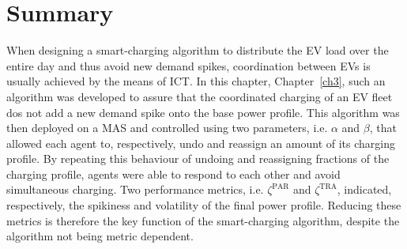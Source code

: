 \section{Summary}
\label{ch3:sec:summary}

When designing a smart-charging algorithm to distribute the EV load over the entire day and thus avoid new demand spikes, coordination between EVs is usually achieved by the means of ICT.
In this chapter, Chapter~\ref{ch3}, such an algorithm was developed to assure that the coordinated charging of an EV fleet dos not add a new demand spike onto the base power profile.
This algorithm was then deployed on a MAS and controlled using two parameters, i.e. $\alpha$ and $\beta$, that allowed each agent to, respectively, undo and reassign an amount of its charging profile.
By repeating this behaviour of undoing and reassigning fractions of the charging profile, agents were able to respond to each other and avoid simultaneous charging.
Two performance metrics, i.e. $\zeta^\text{PAR}$ and $\zeta^\text{TRA}$, indicated, respectively, the spikiness and volatility of the final power profile.
Reducing these metrics is therefore the key function of the smart-charging algorithm, despite the algorithm not being metric dependent.

